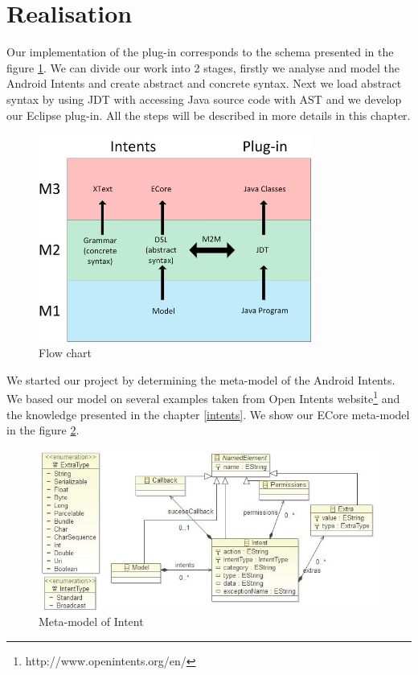 \section{Realisation}

Our implementation of the plug-in corresponds to the schema presented in the figure \ref{flowchart}. We can divide our work into 2 stages, firstly we analyse and model the Android Intents and create abstract and concrete syntax. Next we load abstract syntax by using JDT with accessing Java source code with AST and we develop our Eclipse plug-in. All the steps will be described in more details in this chapter.  

\begin{figure}[H]
\label{flowchart}
  \centering
    \includegraphics[width=0.8\textwidth]{flowchart}
  \caption{Flow chart}
\end{figure}

We started our project by determining the meta-model of the Android Intents. We based our model on several examples taken from Open Intents website\footnote{http://www.openintents.org/en/} and the knowledge presented in the chapter \ref{intents}. We show our ECore meta-model in the figure \ref{meta-model}.

\begin{figure}[H]
\label{meta-model}
  \centering
    \includegraphics[width=\textwidth]{metamodel}
  \caption{Meta-model of Intent}
\end{figure}


